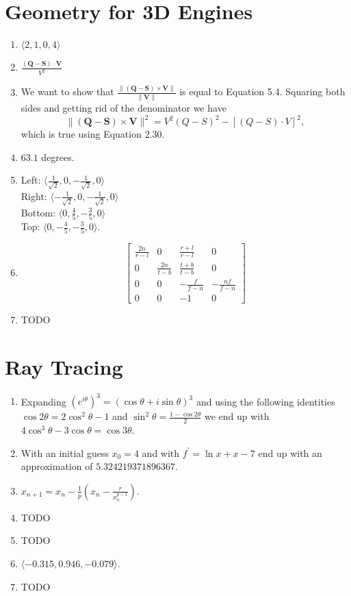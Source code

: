 \documentclass[a4paper]{report}
\begin{document}
\chapter{Geometry for 3D Engines}
\begin{enumerate}
	\item $\langle 2, 1, 0, 4 \rangle$
	\item $\frac{(\mathbf{Q} - \mathbf{S}) \cdot \mathbf{V}}{V^2}$
	\item We want to show that $\frac{\lVert (\mathbf{Q} - \mathbf{S}) \times \mathbf{V} \rVert}{\lVert \mathbf{V} \rVert}$
		is equal to Equation 5.4. Squaring both sides and getting rid of the denominator we have
		\begin{equation*}
			\lVert (\mathbf{Q} - \mathbf{S}) \times \mathbf{V} \rVert^2
			=
			V^2(Q - S)^2 - [(Q - S) \cdot V]^2,
		\end{equation*}
		which is true using Equation 2.30.
	\item $63.1$ degrees.
	\item
		Left: $\langle \frac{1}{\sqrt{2}}, 0, -\frac{1}{\sqrt{2}}, 0 \rangle$\\
		Right: $\langle -\frac{1}{\sqrt{2}}, 0, -\frac{1}{\sqrt{2}}, 0 \rangle$\\
		Bottom: $\langle 0, \frac{4}{5}, -\frac{3}{5}, 0 \rangle$\\
		Top: $\langle 0, -\frac{4}{5}, -\frac{3}{5}, 0 \rangle$.
	\item
		\begin{equation*}
			\left[
				\begin{matrix}
					\frac{2n}{r - l} & 0 & \frac{r + l}{r - l} & 0\\
					0 & \frac{2n}{t - b} & \frac{t + b}{t - b} & 0\\
					0 & 0 & -\frac{f}{f - n} & -\frac{nf}{f - n}\\
					0 & 0 & -1 & 0
				\end{matrix}
				\right]
		\end{equation*}
	\item TODO
\end{enumerate}

\chapter{Ray Tracing}
\begin{enumerate}
	\item Expanding $\left(e^{i\theta}\right)^3=(\cos\theta + i\sin\theta)^3$ and using the following identities
		$\cos2\theta = 2\cos^2\theta-1$ and $\sin^2\theta=\frac{1 - \cos2\theta}{2}$ we end up with
		$4\cos^3\theta - 3\cos\theta=\cos3\theta$.
	\item With an initial guess $x_0 = 4$ and with $f^{\prime}=\ln x + x - 7$ end up with an approximation of
		$5.324219371896367$.
	\item $x_{n+1} = x_n - \frac{1}{p}(x_n - \frac{r}{x_n^{p-1}})$.
	\item TODO
	\item TODO
	\item $\langle -0.315, 0.946, -0.079 \rangle$.
	\item TODO
\end{enumerate}
\end{document}
